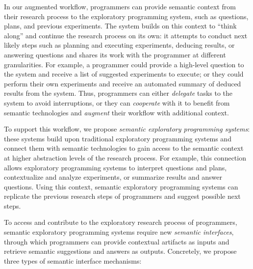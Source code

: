 In our augmented workflow, programmers can provide semantic context from their research process to the exploratory programming system, such as questions, plans, and previous experiments.
The system builds on this context to ``think along'' and continue the research process on its own:
it attempts to conduct next likely steps such as planning and executing experiments, deducing results, or answering questions and shares its work with the programmer at different granularities.
For example, a programmer could provide a high-level question to the system and receive a list of suggested experiments to execute; or they could perform their own experiments and receive an automated summary of deduced results from the system.
Thus, programmers can either \emph{delegate} tasks to the system to avoid interruptions, or they can \emph{cooperate} with it to benefit from semantic technologies and \emph{augment} their workflow with additional context.

To support this workflow, we propose \emph{semantic exploratory programming systems}:
these systems build upon traditional exploratory programming systems and connect them with semantic technologies to gain access to the semantic context at higher abstraction levels of the research process.
For example, this connection allows exploratory programming systems to interpret questions and plans, contextualize and analyze experiments, or summarize results and answer questions.
Using this context, semantic exploratory programming systems can replicate the previous research steps of programmers and suggest possible next steps.

To access and contribute to the exploratory research process of programmers, semantic exploratory programming systems require new \emph{semantic interfaces}, through which programmers can provide contextual artifacts as inputs and retrieve semantic suggestions and answers as outputs.
Concretely, we propose three types of semantic interface mechanisms:

